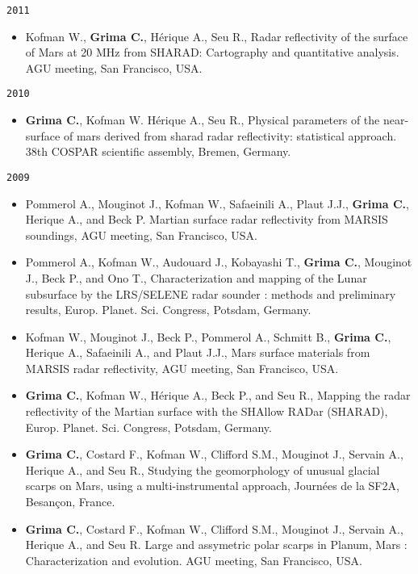 \noindent\texttt{2011}

\begin{itemize}
\item
  Kofman W., \textbf{Grima C.}, Hérique A., Seu R., Radar reflectivity
  of the surface of Mars at 20 MHz from SHARAD: Cartography and
  quantitative analysis. AGU meeting, San Francisco, USA.
\end{itemize}

\texttt{2010}

\begin{itemize}
\item
  \textbf{Grima C.}, Kofman W. Hérique A., Seu R., Physical parameters
  of the near-surface of mars derived from sharad radar reflectivity:
  statistical approach. 38th COSPAR scientific assembly, Bremen,
  Germany.
\end{itemize}

\noindent\texttt{2009}

\begin{itemize}
\item
  Pommerol A., Mouginot J., Kofman W., Safaeinili A., Plaut J.J.,
  \textbf{Grima C.}, Herique A., and Beck P. Martian surface radar
  reflectivity from MARSIS soundings, AGU meeting, San Francisco, USA.
\item
  Pommerol A., Kofman W., Audouard J., Kobayashi T., \textbf{Grima C.},
  Mouginot J., Beck P., and Ono T., Characterization and mapping of the
  Lunar subsurface by the LRS/SELENE radar sounder : methods and
  preliminary results, Europ. Planet. Sci. Congress, Potsdam, Germany.
\item
  Kofman W., Mouginot J., Beck P., Pommerol A., Schmitt B.,
  \textbf{Grima C.}, Herique A., Safaeinili A., and Plaut J.J., Mars
  surface materials from MARSIS radar reflectivity, AGU meeting, San
  Francisco, USA.
\item
  \textbf{Grima C.}, Kofman W., Hérique A., Beck P., and Seu R., Mapping
  the radar reflectivity of the Martian surface with the SHAllow RADar
  (SHARAD), Europ. Planet. Sci. Congress, Potsdam, Germany.
\item
  \textbf{Grima C.}, Costard F., Kofman W., Clifford S.M., Mouginot J.,
  Servain A., Herique A., and Seu R., Studying the geomorphology of
  unusual glacial scarps on Mars, using a multi-instrumental approach,
  Journées de la SF2A, Besançon, France.
\item
  \textbf{Grima C.}, Costard F., Kofman W., Clifford S.M., Mouginot J.,
  Servain A., Herique A., and Seu R. Large and assymetric polar scarps
  in Planum, Mars : Characterization and evolution. AGU meeting, San
  Francisco, USA.
\end{itemize}

